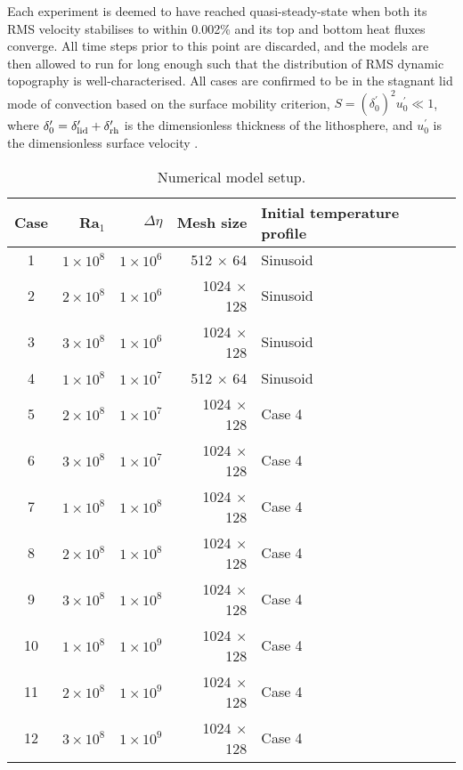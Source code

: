 \documentclass[trackchanges]{aastex63}
\begin{document}
Each experiment is deemed to have reached quasi-steady-state when both its RMS velocity stabilises to within 0.002\% and its top and bottom heat fluxes converge. All time steps prior to this point are discarded, and the models are then allowed to run for long enough such that the distribution of RMS dynamic topography is well-characterised. All cases are confirmed to be in the stagnant lid mode of convection based on the surface mobility criterion, $S = (\delta_0^\prime)^2 u_0^\prime \ll 1$, where $\delta_0^\prime = \delta_{\rm lid}^\prime + \delta_{\rm rh}^\prime$ is the dimensionless thickness of the lithosphere, and $u_0^\prime$ is the dimensionless surface velocity \citep{solomatov_three_1997}.

\begin{table}
\centering
\caption{Numerical model setup.\label{tab:aspect}}
\footnotesize
\begin{tabular}{@{} c r r r l @{}}
\toprule
Case & Ra$_1$ & $\Delta \eta$ & Mesh size & Initial temperature profile \\
\midrule

1 & $1 \times 10^8$ & $1 \times 10^6$ & 512 $\times$ 64 & Sinusoid \\
2 & $2 \times 10^8$ & $1 \times 10^6$ & 1024 $\times$ 128 & Sinusoid \\
3 & $3 \times 10^8$ & $1 \times 10^6$ & 1024 $\times$ 128 & Sinusoid \\

4 & $1 \times 10^8$ & $1 \times 10^7$ & 512 $\times$ 64 & Sinusoid \\
5 & $2 \times 10^8$ & $1 \times 10^7$ & 1024 $\times$ 128 & Case 4 \\
6 & $3 \times 10^8$ & $1 \times 10^7$ & 1024 $\times$ 128 & Case 4 \\

7 & $1 \times 10^8$ & $1 \times 10^8$ & 1024 $\times$ 128 & Case 4 \\
8 & $2 \times 10^8$ & $1 \times 10^8$ & 1024 $\times$ 128 & Case 4 \\
9 & $3 \times 10^8$ & $1 \times 10^8$ & 1024 $\times$ 128 & Case 4 \\

10 & $1 \times 10^8$ & $1 \times 10^9$ & 1024 $\times$ 128 & Case 4 \\
11 & $2 \times 10^8$ & $1 \times 10^9$ & 1024 $\times$ 128 & Case 4 \\
12 & $3 \times 10^8$ & $1 \times 10^9$ & 1024 $\times$ 128 & Case 4 \\

\bottomrule
\end{tabular}
\end{table}
\end{document}
